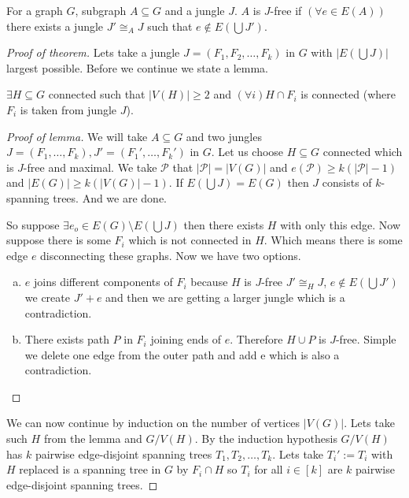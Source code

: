 \begin{defn}
	For a graph $G$, subgraph $A \subseteq G$ and a jungle $J$. $A$ is $J$-free if $(\forall e \in E(A))$ there exists a jungle $J' \cong_A J$ such that $e \notin E(\bigcup J')$. 
\end{defn}

\begin{proof} [Proof of theorem]
	Lets take a jungle $J = (F_{1}, F_{2}, \dots, F_{k})$ in $G$ with $|E (\bigcup J)|$ largest possible. Before we continue we state a lemma.
	
	\begin{lemma}
		$\exists H \subseteq G$ connected such that $|V(H)| \geq 2$ and $(\forall i) H \cap F_{i}$ is connected (where $F_{i}$ is taken from jungle $J$).
	\end{lemma}
	
	\begin{proof}[Proof of lemma]
		We will take $A \subseteq G$ and two jungles $J = (F_{1}, \dots, F_{k}), J' = (F_{1}', \dots, F_{k}')$ in $G$. Let us choose $H \subseteq G$ connected which is $J$-free and maximal. We take $\mathcal{P}$ that $|\mathcal{P}| = |V(G)|$ and $e(\mathcal{P}) \geq k(|\mathcal{P}| - 1)$ and $|E(G)| \geq k (|V(G)| -1)$. If $E(\bigcup J) = E(G)$ then $J$ consists of $k$-spanning trees. And we are done.
		
		So suppose $\exists e_{o} \in E(G) \setminus E(\bigcup J)$ then there exists $H$ with only this edge. Now suppose there is some $F_{i}$ which is not connected in $H$. Which means there is some edge $e$ disconnecting these graphs. Now we have two options.
		
		\begin{enumerate}[(a)]
			\item $e$ joins different components of $F_{i}$ because $H$ is $J$-free $J' \cong_{H} J$, $e \notin E(\bigcup J')$ we create $J' + e$ and then we are getting a larger jungle which is a contradiction.
			
			\item There exists path $P$ in $F_{i}$ joining ends of $e$. Therefore $H \cup P$ is $J$-free. Simple we delete one edge from the outer path and add e which is also a contradiction.
		\end{enumerate}
	\end{proof}
	
	We can now continue by induction on the number of vertices $|V(G)|$. Lets take such $H$ from the lemma and $G / V(H)$. By the induction hypothesis $G / V(H)$ has $k$ pairwise edge-disjoint spanning trees $T_{1}, T_{2}, \dots, T_{k}$. Lets take $T_{i}' := T_{i}$ with $H$ replaced is a spanning tree in $G$ by $F_{i} \cap H$ so $T_{i}$ for all $i \in [k]$ are $k$ pairwise edge-disjoint spanning trees.
	
\end{proof}